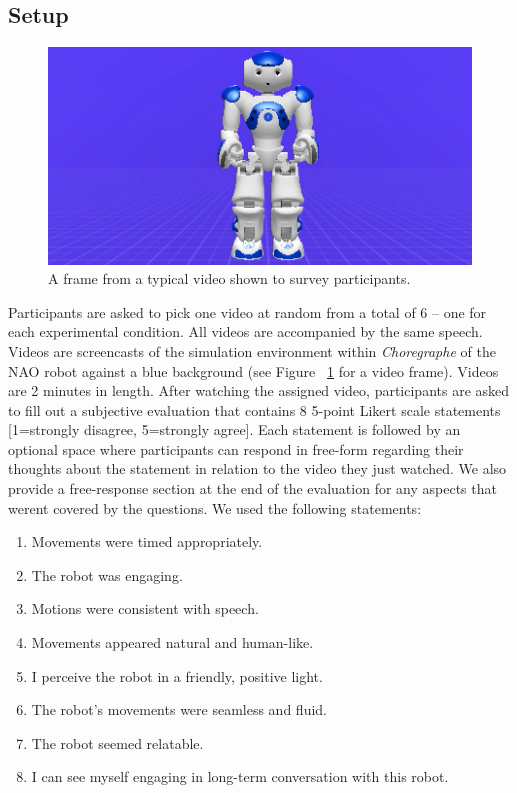 \subsection{Setup}
\begin{figure}
\includegraphics[scale=0.6]{final_frame.png}
\caption{A frame from a typical video shown to survey participants.}
\label{fig:frameshown}
\end{figure}
Participants are asked to pick one video at random from a total of 6 -- one for each experimental condition. All videos are accompanied by the same speech. Videos are screencasts of the simulation environment within \textit{Choregraphe} of the NAO robot against a blue background (see Figure ~\ref{fig:frameshown} for a video frame). Videos are 2 minutes in length. After watching the assigned video, participants are asked to fill out a subjective evaluation that contains 8 5-point Likert scale statements [1=strongly disagree, 5=strongly agree]. Each statement is followed by an optional space where participants can respond in free-form regarding their thoughts about the statement in relation to the video they just watched. We also provide a free-response section at the end of the evaluation for any aspects that weren\textquotesingle t covered by the questions. We used the following statements:
\begin{enumerate}
\item Movements were timed appropriately.
\item The robot was engaging.
\item Motions were consistent with speech.
\item Movements appeared natural and human-like.
\item I perceive the robot in a friendly, positive light.
\item The robot's movements were seamless and fluid.
\item The robot seemed relatable.
\item I can see myself engaging in long-term conversation with this robot.
\end{enumerate}

